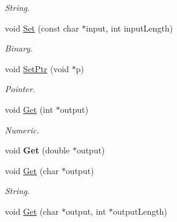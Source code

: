 \begin{DoxyCompactItemize}
\begin{DoxyCompactList}\small\item\em String. \end{DoxyCompactList}\item 
\hypertarget{struct_data_structures_1_1_table_1_1_cell_a8f7a2174e21e895b3960efaa02f3adb4}{void \hyperlink{struct_data_structures_1_1_table_1_1_cell_a8f7a2174e21e895b3960efaa02f3adb4}{Set} (const char $\ast$input, int input\-Length)}\label{struct_data_structures_1_1_table_1_1_cell_a8f7a2174e21e895b3960efaa02f3adb4}

\begin{DoxyCompactList}\small\item\em Binary. \end{DoxyCompactList}\item 
\hypertarget{struct_data_structures_1_1_table_1_1_cell_ae85207fbf2e07fad48c12fc002e01c43}{void \hyperlink{struct_data_structures_1_1_table_1_1_cell_ae85207fbf2e07fad48c12fc002e01c43}{Set\-Ptr} (void $\ast$p)}\label{struct_data_structures_1_1_table_1_1_cell_ae85207fbf2e07fad48c12fc002e01c43}

\begin{DoxyCompactList}\small\item\em Pointer. \end{DoxyCompactList}\item 
\hypertarget{struct_data_structures_1_1_table_1_1_cell_a77443a239fdee25915148075f9a16037}{void \hyperlink{struct_data_structures_1_1_table_1_1_cell_a77443a239fdee25915148075f9a16037}{Get} (int $\ast$output)}\label{struct_data_structures_1_1_table_1_1_cell_a77443a239fdee25915148075f9a16037}

\begin{DoxyCompactList}\small\item\em Numeric. \end{DoxyCompactList}\item 
\hypertarget{struct_data_structures_1_1_table_1_1_cell_a2fe78fafd73ffcec6da4b5e7ede6186b}{void {\bfseries Get} (double $\ast$output)}\label{struct_data_structures_1_1_table_1_1_cell_a2fe78fafd73ffcec6da4b5e7ede6186b}

\item 
\hypertarget{struct_data_structures_1_1_table_1_1_cell_a0e5942295b6e1da78218b1977fc93a27}{void \hyperlink{struct_data_structures_1_1_table_1_1_cell_a0e5942295b6e1da78218b1977fc93a27}{Get} (char $\ast$output)}\label{struct_data_structures_1_1_table_1_1_cell_a0e5942295b6e1da78218b1977fc93a27}

\begin{DoxyCompactList}\small\item\em String. \end{DoxyCompactList}\item 
\hypertarget{struct_data_structures_1_1_table_1_1_cell_a4cd513bda6ebc656f8b0a73ba22952c8}{void \hyperlink{struct_data_structures_1_1_table_1_1_cell_a4cd513bda6ebc656f8b0a73ba22952c8}{Get} (char $\ast$output, int $\ast$output\-Length)}\label{struct_data_structures_1_1_table_1_1_cell_a4cd513bda6ebc656f8b0a73ba22952c8}


\end{DoxyCompactItemize}
